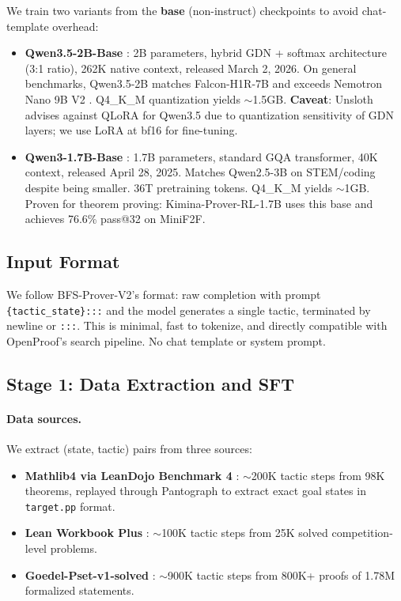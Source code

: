 \documentclass[11pt,a4paper]{article}
\begin{document}
We train two variants from the \textbf{base} (non-instruct) checkpoints to avoid chat-template overhead:

\begin{itemize}
\item \textbf{Qwen3.5-2B-Base} \citep{qwen35}: 2B parameters, hybrid GDN + softmax architecture (3:1 ratio), 262K native context, released March 2, 2026. On general benchmarks, Qwen3.5-2B matches Falcon-H1R-7B and exceeds Nemotron Nano 9B V2 \citep{qwen35}. Q4\_K\_M quantization yields $\sim$1.5GB. \textbf{Caveat}: Unsloth advises against QLoRA for Qwen3.5 due to quantization sensitivity of GDN layers; we use LoRA at bf16 for fine-tuning.

\item \textbf{Qwen3-1.7B-Base} \citep{qwen3}: 1.7B parameters, standard GQA transformer, 40K context, released April 28, 2025. Matches Qwen2.5-3B on STEM/coding despite being smaller. 36T pretraining tokens. Q4\_K\_M yields $\sim$1GB. Proven for theorem proving: Kimina-Prover-RL-1.7B uses this base and achieves 76.6\% pass@32 on MiniF2F.
\end{itemize}

\subsection{Input Format}

We follow BFS-Prover-V2's format: raw completion with prompt \texttt{\{tactic\_state\}:::} and the model generates a single tactic, terminated by newline or \texttt{:::}. This is minimal, fast to tokenize, and directly compatible with OpenProof's search pipeline. No chat template or system prompt.

\subsection{Stage 1: Data Extraction and SFT}
\label{sec:stage1}

\paragraph{Data sources.} We extract (state, tactic) pairs from three sources:

\begin{itemize}
\item \textbf{Mathlib4 via LeanDojo Benchmark 4} \citep{leandojo}: $\sim$200K tactic steps from 98K theorems, replayed through Pantograph \citep{pantograph} to extract exact goal states in \texttt{target.pp} format.

\item \textbf{Lean Workbook Plus} \citep{leanworkbook}: $\sim$100K tactic steps from 25K solved competition-level problems.

\item \textbf{Goedel-Pset-v1-solved} \citep{goedel}: $\sim$900K tactic steps from 800K+ proofs of 1.78M formalized statements.
\end{itemize}
\end{document}
